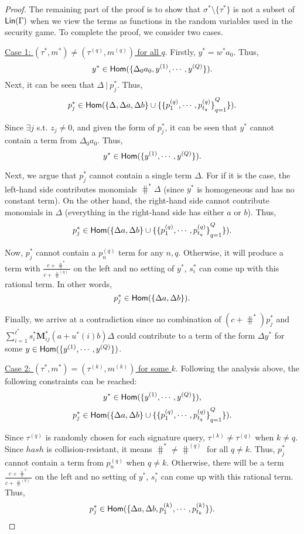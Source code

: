 \begin{proof}
The remaining part of the proof is to show that $\sigma^\ast\setminus\{\tau^\ast\}$ is not a subset of $\textsf{Lin}(\Gamma)$ when we view the terms as functions in the random variables used in the security game. To complete the proof, we consider two cases.

\noindent\underline{Case 1: $(\tau^\ast, m^\ast) \neq (\tau^{(q)}, m^{(q)})$ for all $q$}. Firstly, $y^\ast =w^\ast a_0$. Thus,
$$
y^\ast \in \textsf{Hom}(\{\Delta_0a_0, y^{(1)}, \cdots, y^{(Q)}\}).
$$ Next, it can be seen that $\Delta ~|~ p_j^\ast$. Thus,
$$
p_j^\ast \in \textsf{Hom}( \{\Delta, \Delta a, \Delta b\} \cup \{ {\{p_1^{(q)}, \cdots, p_{t_q}^{(q)}  \}}_{q=1}^Q\} ).
$$

Since $\exists j$ s.t. $z_j \neq 0$, and given the form of $p_j^\ast$,  it can be seen that $y^\ast$ cannot contain a term from $\Delta_0 a_0$. Thus,
$$
y^\ast \in \textsf{Hom}(\{y^{(1)}, \cdots, y^{(Q)}\}).
$$

Next, we argue that $p_j^\ast$ cannot contain a single term $\Delta$. For if it is the case, the left-hand side contributes monomials $\hash^\ast\Delta$ (since $y^\ast$ is homogeneous and has no constant term). On the other hand, the right-hand side cannot contribute monomials in $\Delta$ (everything in the right-hand side has either $a$ or $b$).  Thus,
$$
p_j^\ast \in \textsf{Hom}( \{\Delta a, \Delta b\} \cup \{ {\{p_1^{(q)}, \cdots, p_{t_q}^{(q)}  \}}_{q=1}^Q\} ).
$$

Now, $p_j^\ast$ cannot contain a $p_n^{(q)}$ term for any $n, q$. Otherwise, it will produce a term with $\frac{c+\hash^\ast}{c+\hash^{(q)}}$ on the left and no setting of $y^\ast$, $s_i^\ast$ can come up with this rational term.  In other words,
$$
p_j^\ast \in \textsf{Hom}( \{\Delta a, \Delta b\}).
$$

Finally, we arrive at a contradiction since no combination of $(c+\hash^\ast)p_j^\ast$ and $\sum_{i=1}^{\ell^\ast} s^\ast_i \mathbf{M}^\ast_{ij}(a+u^\ast(i)b)\Delta$ could contribute to a term of the form $\Delta y^\ast$ for some $y\in \textsf{Hom}(\{y^{(1)}, \cdots, y^{(Q)}\})$.

\noindent\underline{Case 2: $(\tau^\ast, m^\ast) = (\tau^{(k)}, m^{(k)})$ for some $k$}. Following the analysis above, the following constraints can be reached:
$$
y^\ast \in \textsf{Hom}(\{y^{(1)}, \cdots, y^{(Q)}\}),
$$
$$
p_j^\ast \in \textsf{Hom}( \{\Delta a, \Delta b\} \cup \{ {\{p_1^{(q)}, \cdots, p_{t_q}^{(q)}  \}}_{q=1}^Q\} ).
$$

Since $\tau^{(q)}$ is randomly chosen for each signature query, $\tau^{(k)} \neq \tau^{(q)}$ when $k\neq q$. Since $hash$ is collision-resistant, it means $\hash^\ast \neq \hash^{(q)}$ for all $q\neq k$. Thus, $p_j^\ast$ cannot contain a term from $p_n^{(q)}$ when $q\neq k$. Otherwise, there will be a term $\frac{c+\hash^\ast}{c+\hash^{(q)}}$ on the left and no setting of $y^\ast$, $s_i^\ast$ can come up with this rational term. Thus,
$$
p_j^\ast \in \textsf{Hom}( \{\Delta a, \Delta b, p_1^{(k)}, \cdots, p_{t_k}^{(k)}\} ).
$$


\end{proof}
